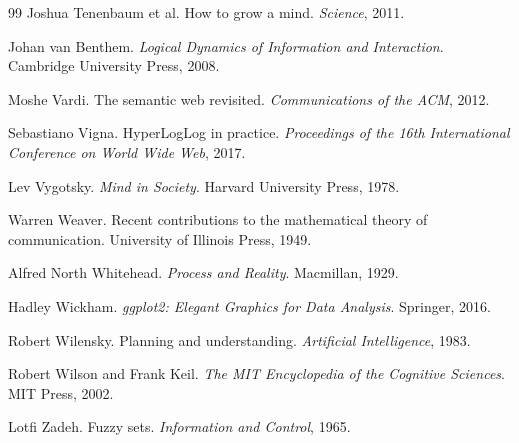 \documentclass[12pt,a4paper]{article}
\begin{document}
\begin{thebibliography}{99}
Joshua Tenenbaum et al.
How to grow a mind.
\textit{Science}, 2011.

Johan van Benthem.
\textit{Logical Dynamics of Information and Interaction}.
Cambridge University Press, 2008.

Moshe Vardi.
The semantic web revisited.
\textit{Communications of the ACM}, 2012.

Sebastiano Vigna.
HyperLogLog in practice.
\textit{Proceedings of the 16th International Conference on World Wide Web}, 2017.

Lev Vygotsky.
\textit{Mind in Society}.
Harvard University Press, 1978.

Warren Weaver.
Recent contributions to the mathematical theory of communication.
University of Illinois Press, 1949.

Alfred North Whitehead.
\textit{Process and Reality}.
Macmillan, 1929.

Hadley Wickham.
\textit{ggplot2: Elegant Graphics for Data Analysis}.
Springer, 2016.

Robert Wilensky.
Planning and understanding.
\textit{Artificial Intelligence}, 1983.

Robert Wilson and Frank Keil.
\textit{The MIT Encyclopedia of the Cognitive Sciences}.
MIT Press, 2002.

Lotfi Zadeh.
Fuzzy sets.
\textit{Information and Control}, 1965.

\end{thebibliography}
\end{document}
